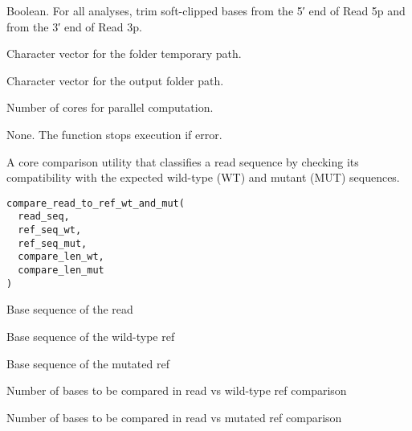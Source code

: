 \documentclass[a4paper]{book}
\begin{document}
\begin{Arguments}
\begin{ldescription}
\item[\code{remove\_softclip}] Boolean. For all analyses, trim soft-clipped bases from the 5′ end of Read 5p and from the 3′ end of Read 3p.

\item[\code{tmp\_folder}] Character vector for the folder temporary path.

\item[\code{output\_folder}] Character vector for the output folder path.

\item[\code{n\_cores}] Number of cores for parallel computation.
\end{ldescription}
\end{Arguments}
%
\begin{Value}
None. The function stops execution if error.
\end{Value}
%
\begin{Description}
A core comparison utility that classifies a read sequence by checking its compatibility with the
expected wild-type (WT) and mutant (MUT) sequences.
\end{Description}
%
\begin{Usage}
\begin{verbatim}
compare_read_to_ref_wt_and_mut(
  read_seq,
  ref_seq_wt,
  ref_seq_mut,
  compare_len_wt,
  compare_len_mut
)
\end{verbatim}
\end{Usage}
%
\begin{Arguments}
\begin{ldescription}
\item[\code{read\_seq}] Base sequence of the read

\item[\code{ref\_seq\_wt}] Base sequence of the wild-type ref

\item[\code{ref\_seq\_mut}] Base sequence of the mutated ref

\item[\code{compare\_len\_wt}] Number of bases to be compared in read vs wild-type ref comparison

\item[\code{compare\_len\_mut}] Number of bases to be compared in read vs mutated ref comparison
\end{ldescription}
\end{Arguments}
\end{document}
